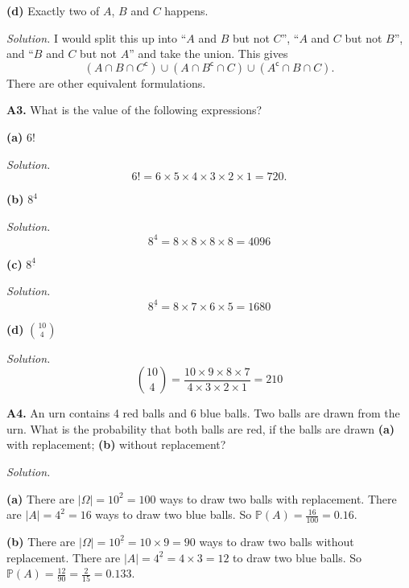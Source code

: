 \documentclass[
  a4paper,
]{book}
\theoremstyle{definition}
\theoremstyle{definition}
\theoremstyle{definition}
\theoremstyle{definition}
\theoremstyle{remark}
\begin{document}
\textbf{(d)} Exactly two of \(A\), \(B\) and \(C\) happens.

\begin{myanswers}
\emph{Solution.} I would split this up into ``\(A\) and \(B\) but not \(C\)'', ``\(A\) and \(C\) but not \(B\)'', and ``\(B\) and \(C\) but not \(A\)'' and take the union. This gives
\[  (A \cap B \cap C^{\mathsf{c}}) \cup (A \cap B^{\mathsf{c}} \cap C) \cup (A^{\mathsf{c}} \cap B \cap C) . \]
There are other equivalent formulations.

\end{myanswers}

\textbf{A3.} What is the value of the following expressions?

\textbf{(a)} \(6!\)

\begin{myanswers}
\emph{Solution.}
\[ 6! = 6 \times 5 \times 4 \times 3 \times 2 \times 1 = 720. \]

\end{myanswers}

\textbf{(b)} \(8^4\)

\begin{myanswers}
\emph{Solution.}
\[ 8^4 = 8 \times 8 \times 8 \times 8 = 4096 \]

\end{myanswers}

\textbf{(c)} \({8}^{\underline{4}}\)

\begin{myanswers}
\emph{Solution.}
\[ {8}^{\underline{4}} = 8 \times 7 \times 6 \times 5 = 1680 \]

\end{myanswers}

\textbf{(d)} \({\displaystyle \binom{10}{4}}\)

\begin{myanswers}
\emph{Solution.}
\[ \binom{10}{4} = \frac{10 \times 9 \times 8 \times 7}{4\times 3\times 2\times 1} = 210 \]

\end{myanswers}

\textbf{A4.} An urn contains 4 red balls and 6 blue balls. Two balls are drawn from the urn. What is the probability that both balls are red, if the balls are drawn \textbf{(a)} with replacement; \textbf{(b)} without replacement?

\begin{myanswers}
\emph{Solution.}

\textbf{(a)} There are \(|\Omega| = 10^2 = 100\) ways to draw two balls with replacement. There are \(|A| = 4^2=16\) ways to draw two blue balls. So
\(\mathbb P(A) = \frac{16}{100} = 0.16\).

\textbf{(b)} There are \(|\Omega| = {10}^{\underline{2}} = 10 \times 9 = 90\) ways to draw two balls without replacement. There are \(|A| = {4}^{\underline{2}} = 4 \times 3 = 12\) to draw two blue balls. So
\(\mathbb P(A) = \frac{12}{90} = \frac{2}{15} = 0.133\).

\end{myanswers}
\end{document}

